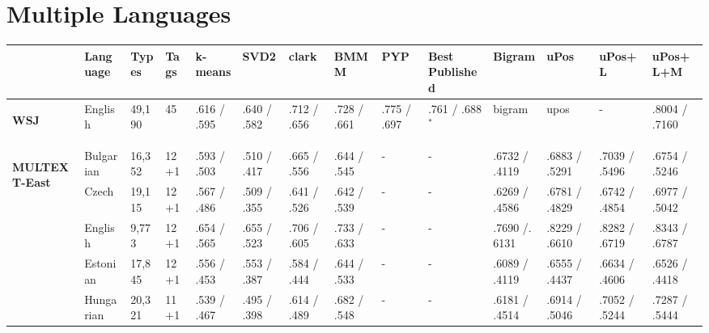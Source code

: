 \section{Multiple Languages}
\begin{landscape}
\begin{table}[ht]
  \tiny
  \begin{flushleft}
  \begin{tabular}{|l|l|l|l|p{1.5cm}|p{1.5cm}|p{1.5cm}|p{1.5cm}|p{1.5cm}|p{2cm}|p{2cm}|p{2cm}|p{2cm}|p{2cm}|}
        \hline
        & Language   & Types   & Tags & k-means      & SVD2         & clark        & BMMM         & PYP             & Best Published            & Bigram &uPos           & uPos+L            & uPos+L+M     \\ \hline %
        \multirow{1}{*}{\begin{sideways}\textbf{WSJ}\end{sideways}} 
        & English    & 49,190  & 45   & .616 / .595   & .640 / .582   & .712 / .656   & .728 / .661   & .775 / .697 & .761 / .688$^*$  &bigram &upos & - & .8004 / .7160           \\
        & & & & & & & & & & & & &\\ \hline
        \multirow{8}{*}{\begin{sideways}\textbf{MULTEXT-East}\end{sideways}} & 
        Bulgarian    & 16,352  & 12+1 & .593 / .503   & .510 / .417   & .665 / .556   & .644 / .545   & -           & - & .6732 / .4119 & .6883 / .5291 & .7039 / .5496     & .6754 / .5246 \\
        & Czech      & 19,115  & 12+1 & .567 / .486   & .509 / .355   & .641 / .526   & .642 / .539   & -           & - & .6269 / .4586 & .6781 / .4829 & .6742 / .4854     & .6977 / .5042 \\
        & English    & 9,773   & 12+1 & .654 / .565   & .655 / .523   & .706 / .605   & .733 / .633   & -           & - & .7690 /. 6131 & .8229 / .6610 & .8282 / .6719     & .8343 / .6787 \\
        & Estonian   & 17,845  & 12+1 & .556 / .453   & .553 / .387   & .584 / .444   & .644 / .533   & -           & - & .6089 / .4119 & .6555 / .4437 & .6634 / .4606     & .6526 / .4418 \\
        & Hungarian  & 20,321  & 11+1 & .539 / .467   & .495 / .398   & .614 / .489   & .682 / .548   & -           & - & .6181 / .4514 & .6914 / .5046 & .7052 / .5244     & .7287 / .5444 \\

\end{tabular}
\end{flushleft}
\end{table}
\end{landscape}
